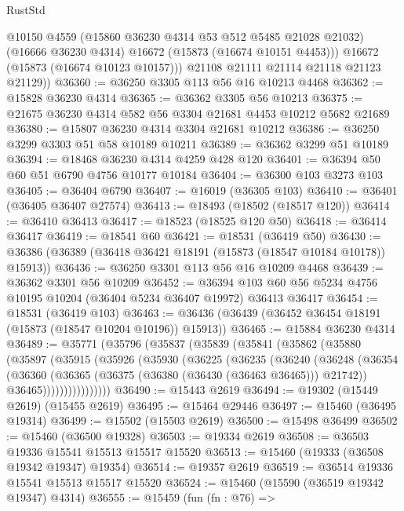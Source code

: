 \begin{lexlean}{RustStd}
\begin{coremodule}
            @10150
            @4559
            (@15860 @36230 @4314 @53 @512 @5485 @21028 @21032)
            (@16666 @36230 @4314)
            @16672
            (@15873 (@16674 @10151 @4453)))
          @16672
          (@15873 (@16674 @10123 @10157)))
        @21108
        @21111
        @21114
        @21118
        @21123
        @21129))
@36360 := @36250 @3305 @113 @56 @16 @10213 @4468
@36362 := @15828 @36230 @4314
@36365 := @36362 @3305 @56 @10213
@36375 := @21675 @36230 @4314 @582 @56 @3304 @21681 @4453 @10212 @5682 @21689
@36380 := @15807 @36230 @4314 @3304 @21681 @10212
@36386 := @36250 @3299 @3303 @51 @58 @10189 @10211
@36389 := @36362 @3299 @51 @10189
@36394 := @18468 @36230 @4314 @4259 @428 @120
@36401 := @36394 @50 @60 @51 @6790 @4756 @10177 @10184
@36404 := @36300 @103 @3273 @103
@36405 := @36404 @6790
@36407 := @16019 (@36305 @103)
@36410 := @36401 (@36405 @36407 @27574)
@36413 := @18493 (@18502 (@18517 @120))
@36414 := @36410 @36413
@36417 := @18523 (@18525 @120 @50)
@36418 := @36414 @36417
@36419 := @18541 @60
@36421 := @18531 (@36419 @50)
@36430 := @36386 (@36389 (@36418 @36421 @18191 (@15873 (@18547 @10184 @10178)) @15913))
@36436 := @36250 @3301 @113 @56 @16 @10209 @4468
@36439 := @36362 @3301 @56 @10209
@36452 := @36394 @103 @60 @56 @5234 @4756 @10195 @10204 (@36404 @5234 @36407 @19972) @36413 @36417
@36454 := @18531 (@36419 @103)
@36463 := @36436 (@36439 (@36452 @36454 @18191 (@15873 (@18547 @10204 @10196)) @15913))
@36465 := @15884 @36230 @4314
@36489 := @35771
    (@35796
      (@35837
        (@35839
          (@35841
            (@35862
              (@35880
                (@35897
                  (@35915
                    (@35926
                      (@35930
                        (@36225
                          (@36235
                            (@36240
                              (@36248
                                (@36354
                                  (@36360
                                    (@36365 (@36375 (@36380 (@36430 (@36463 @36465))) @21742))
                                    @36465))))))))))))))))
@36490 := @15443 @2619
@36494 := @19302 (@15449 @2619) (@15455 @2619)
@36495 := @15464 @29446
@36497 := @15460 (@36495 @19314)
@36499 := @15502 (@15503 @2619)
@36500 := @15498 @36499
@36502 := @15460 (@36500 @19328)
@36503 := @19334 @2619
@36508 := @36503 @19336 @15541 @15513 @15517 @15520
@36513 := @15460 (@19333 (@36508 @19342 @19347) @19354)
@36514 := @19357 @2619
@36519 := @36514 @19336 @15541 @15513 @15517 @15520
@36524 := @15460 (@15590 (@36519 @19342 @19347) @4314)
@36555 := @15459
    (fun (fn : @76) =>

\end{coremodule}
\end{lexlean}
